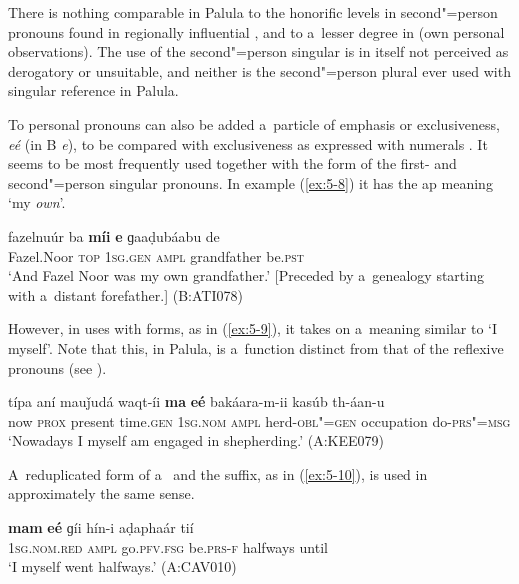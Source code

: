 There is nothing comparable in Palula to the honorific levels in second"=person pronouns found in regionally influential \iliUrdu \citep[17]{schmidt1999}, and to a~lesser degree in \iliPashto (own personal observations). The use of the second"=person singular is in itself not perceived as derogatory or unsuitable, and neither is the second"=person plural  ever used with singular reference in Palula.

To personal pronouns can also be added a~particle of emphasis or exclusiveness, \textit{eé} (in B \textit{e}), to be compared with exclusiveness as expressed with numerals . It seems to be most frequently used together with the  form of the first- and second"=person singular pronouns. In example (\ref{ex:5-8}) it has the ap meaning `my \textit{own}'.



\begin{exe}
\ex
\label{ex:5-8}
\gll fazelnuúr ba \textbf{míi} \textbf{e} ɡaaḍubáabu de \\
	Fazel.Noor \textsc{top} \textsc{1sg.gen} \textsc{ampl} grandfather be.\textsc{pst} \\
\glt `And Fazel Noor was my own grandfather.' [Preceded by a~genealogy starting with a~distant forefather.] (B:ATI078)
\end{exe}

However, in uses with   forms, as in (\ref{ex:5-9}), it takes on a~meaning similar to `I myself'. Note that this, in Palula, is a~function distinct from that of the reflexive pronouns (see ).

\begin{exe}
\ex
\label{ex:5-9}
\gll típa aní mauǰudá waqt-íi \textbf{ma} \textbf{eé} bakáara-m-ii kasúb th-áan-u\\
	now \textsc{prox} present time.\textsc{gen} \textsc{1sg.nom} \textsc{ampl} herd-\textsc{obl"=gen} occupation do-\textsc{prs"=msg}\\
\glt `Nowadays I myself am engaged in shepherding.' (A:KEE079)
\end{exe}


A~reduplicated form of a~ and the suffix, as in (\ref{ex:5-10}), is used in approximately the same sense.


\begin{exe}
\ex
\label{ex:5-10}
\gll \textbf{mam} \textbf{eé} ɡíi hín-i aḍaphaár tií\\
\textsc{1sg.nom.red} \textsc{ampl} go.\textsc{pfv.fsg} be.\textsc{prs-f} halfways until \\
\glt `I myself went halfways.' (A:CAV010)
\end{exe}

